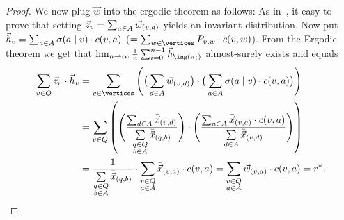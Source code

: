 \begin{proof}
We now plug $ \vec{w} $ into the ergodic theorem as follows: As in~, it easy to prove that setting $\vec{z}_v=\sum_{a\in A}\vec{w}_{(v,a)}$ yields an invariant distribution. Now put $\vec{h}_v=\sum_{a\in A}\sigma(a\mid v)\cdot c(v,a)$ ($ =  \sum_{w \in \vertices} \mcprob_{v,w}\cdot \colouring(v,w)$). From the Ergodic theorem we get that $\lim_{n \rightarrow \infty} \frac{1}{n} \sum_{i=0}^{n-1}\vec{h}_{\ing(\pi_i)}$ almost-surely exists and equals 
\begin{align}
\sum_{v\in Q} \invdist_v\cdot \vec{h}_v &= \sum_{v\in \vertices} \left(\big(\sum_{d\in\actions}\vec{w}_{(v,d)}\big)\cdot \big(\sum_{a\in\actions}\sigma(a\mid v)\cdot \colouring(v,a) \big)\right) \nonumber\\
&= \sum_{v\in Q} \left(\Bigg( \frac{\sum_{d\in\actions}\lpsol{x}_{(v,d)}}{\sum\limits_{\substack{q\in Q\\ b\in \actions}} \lpsol{x}_{(q,b)}} \Bigg)\cdot \Bigg( \frac{\sum_{a\in\actions}\lpsol{x}_{(v,a)}\cdot\colouring(v,a)}{\sum\limits_{d\in  \actions} \lpsol{x}_{(v,d)}} \Bigg) \right) \nonumber\\
&= \frac{1}{\sum\limits_{\substack{q\in Q\\ b\in \actions}} \lpsol{x}_{(q,b)}}\cdot\sum\limits_{\substack{v\in Q\\ a\in\actions}} \lpsol{x}_{(v,a)}\cdot \colouring(v,a) = \sum\limits_{\substack{v\in Q\\ a\in\actions}} \vec{w}_{(v,a)}\cdot\colouring(v,a) =r^*.\label{5-eq:ergodic-use}
\end{align}


\end{proof}
